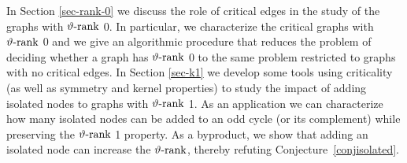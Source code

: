 \documentclass[11pt]{article}
\numberwithin{equation}{section}
\newcommand{\rrank}{\vartheta\text{\rm -rank}}
\begin{document}
 In Section \ref{sec-rank-0} we discuss the role of critical edges in the study of the graphs with $\rrank$ 0.
  In particular, we characterize the critical graphs with $\rrank$ 0 and we give an algorithmic procedure that reduces the problem of deciding whether a graph has $\rrank$ 0 to the same problem restricted to graphs with no critical edges. In Section \ref{sec-k1} we develop some tools using criticality (as well as symmetry and kernel properties) to study the impact of adding isolated nodes to graphs with $\rrank$ 1. As an application we can characterize how many isolated nodes can be added to an odd cycle (or its complement) while preserving the $\rrank$ 1 property. As a byproduct, we show that adding an isolated node can increase the $\rrank$, thereby refuting Conjecture~\ref{conjisolated}. %
\end{document}
